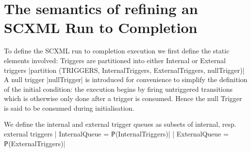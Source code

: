 
\section{The semantics of refining an SCXML Run to Completion}

To define the SCXML run to completion execution we first define the static elements involved: 
Triggers are partitioned into either Internal or External triggers
|partition (TRIGGERS, InternalTriggers, ExternalTriggers, {nullTrigger})|
A null trigger |nullTrigger| is introduced for convenience to simplify the definition of the initial condition: the execution begins by firing untriggered transitions which is otherwise only done after a trigger is consumed. Hence the null Trigger is said to be consumed during initialisation.

We define the internal and external trigger queues as subsets of internal, resp. external triggers
|	InternalQueue = ℙ(InternalTriggers)|
|	ExternalQueue = ℙ(ExternalTriggers)|


